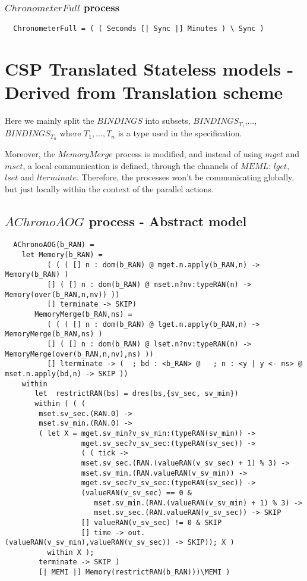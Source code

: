 \subsubsection{$ChronometerFull$ process}

\begin{verbatim}
  ChronometerFull = ( ( Seconds [| Sync |] Minutes ) \ Sync )
\end{verbatim}
\pagebreak

\section{CSP Translated Stateless models - Derived from Translation scheme}
Here we mainly split the $BINDINGS$ into subsets, $BINDINGS_{T_1}$,...,$BINDINGS_{T_n}$ where $T_1,...,T_n$ is a type used in the specification.

Moreover, the $MemoryMerge$ process is modified, and instead of using $mget$ and $mset$, a local communication is defined, through the channels of $MEML$: $lget$, $lset$ and $lterminate$. Therefore, the processes won't be communicating globally, but just locally within the context of the parallel actions.

\subsection{$AChronoAOG$ process - Abstract model}

\begin{verbatim}
  AChronoAOG(b_RAN) =
    let Memory(b_RAN) =
          ( ( ( [] n : dom(b_RAN) @ mget.n.apply(b_RAN,n) -> Memory(b_RAN) )
          [] ( [] n : dom(b_RAN) @ mset.n?nv:typeRAN(n) -> Memory(over(b_RAN,n,nv)) ))
          [] terminate -> SKIP)
       MemoryMerge(b_RAN,ns) =
          ( ( ( [] n : dom(b_RAN) @ lget.n.apply(b_RAN,n) -> MemoryMerge(b_RAN,ns) )
          [] ( [] n : dom(b_RAN) @ lset.n?nv:typeRAN(n) -> MemoryMerge(over(b_RAN,n,nv),ns) ))
          [] lterminate -> (  ; bd : <b_RAN> @   ; n : <y | y <- ns> @  mset.n.apply(bd,n) -> SKIP ))
    within
       let  restrictRAN(bs) = dres(bs,{sv_sec, sv_min})
       within ( ( (
        mset.sv_sec.(RAN.0) ->
        mset.sv_min.(RAN.0) ->
        ( let X = mget.sv_min?v_sv_min:(typeRAN(sv_min)) ->
                  mget.sv_sec?v_sv_sec:(typeRAN(sv_sec)) ->
                  ( ( tick ->
                  mset.sv_sec.(RAN.(valueRAN(v_sv_sec) + 1) % 3) ->
                  mset.sv_min.(RAN.valueRAN(v_sv_min)) ->
                  mget.sv_sec?v_sv_sec:(typeRAN(sv_sec)) ->
                  (valueRAN(v_sv_sec) == 0 &
                     mset.sv_min.(RAN.(valueRAN(v_sv_min) + 1) % 3) ->
                     mset.sv_sec.(RAN.valueRAN(v_sv_sec)) -> SKIP
                  [] valueRAN(v_sv_sec) != 0 & SKIP
                  [] time -> out.(valueRAN(v_sv_min),valueRAN(v_sv_sec)) -> SKIP)); X )
          within X );
        terminate -> SKIP )
        [| MEMI |] Memory(restrictRAN(b_RAN)))\MEMI )
\end{verbatim}
\pagebreak
